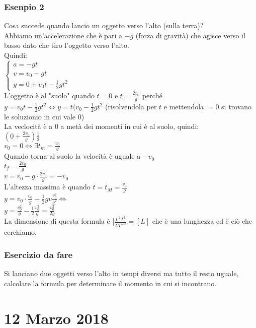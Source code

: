 \documentclass{article}
\begin{document}
\subsubsection*{Esenpio 2}
Cosa succede quando lancio un oggetto verso l'alto (sulla terra)?\\
Abbiamo un'accelerazione che \`{e} pari a $-g$ (forza di gravit\`{a}) che agisce
verso il basso dato che tiro l'oggetto verso l'alto.\\
Quindi:\\
$
\begin{cases}
a=-gt\\
v=v_0-gt\\
y=0+v_0t-\frac{1}{2}gt^2
\end{cases}
$
\\
L'oggetto \`{e} al "suolo" quando $t=0$ e $t=\frac{2v_0}{g}$ perch\'{e}
$y=v_0t-\frac{1}{2}gt^2\Leftrightarrow y=t(v_0-\frac{1}{2}gt^2$ (risolvendola per $t$ e mettendola
$=0$ si trovano le soluzionio in cui vale 0)\\
La veclocit\`{a} \`{e} a 0 a met\`{a} dei momenti in cui \`{e} al suolo, quindi:\\
$(0+\frac{2v_0}{g})\frac{1}{2}$\\
$v_0=0\Leftrightarrow \exists t_m=\frac{v_0}{g}$\\
Quando torna al suolo la velocit\`{a} \`{e} uguale a $-v_0$\\
$t_f=\frac{2v_0}{g}$\\
$v=v_0-g\cdot\frac{2v_0}{g}=-v_0$\\
L'altezza massima \`{e} quando $t=t_M=\frac{v_0}{g}$\\
$y=v_0\cdot\frac{v_0}{g}-\frac{1}{2}gv\frac{v_0^2}{g^2}\Leftrightarrow$\\
$y=\frac{v_0^2}{g}-\frac{1}{2}\frac{v_0^2}{g}=\frac{v_0^2}{2g}$\\
La dimensione di questa formula \`{e} $[\frac{L^2T^2}{LT^{-2}}=[L]$ che \`{e}
una lunghezza ed \`{e} ci\`{o} che cerchiamo.\\
\subsubsection*{Esercizio da fare}
Si lanciano due oggetti verso l'alto in tempi diversi ma tutto il resto uguale,
calcolare la formula per determinare il momento in cui si incontrano.\\
\section*{12 Marzo 2018}
\end{document}
